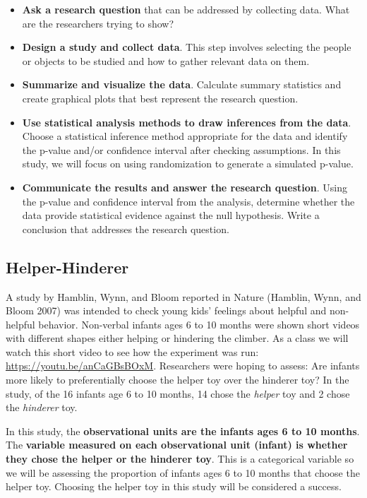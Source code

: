 \documentclass[
]{report}
\begin{document}
\begin{itemize}
\item
  \textbf{Ask a research question} that can be addressed by collecting data. What are the researchers trying to show?
\item
  \textbf{Design a study and collect data}. This step involves selecting the people or objects to be studied and how to gather relevant data on them.
\item
  \textbf{Summarize and visualize the data}. Calculate summary statistics and create graphical plots that best represent the research question.
\item
  \textbf{Use statistical analysis methods to draw inferences from the data}. Choose a statistical inference method appropriate for the data and identify the p-value and/or confidence interval after checking assumptions. In this study, we will focus on using randomization to generate a simulated p-value.
\item
  \textbf{Communicate the results and answer the research question}. Using the p-value and confidence interval from the analysis, determine whether the data provide statistical evidence against the null hypothesis. Write a conclusion that addresses the research question.
\end{itemize}

\newpage

\hypertarget{helper-hinderer}{%
\subsection{Helper-Hinderer}\label{helper-hinderer}}

A study by Hamblin, Wynn, and Bloom reported in Nature (Hamblin, Wynn, and Bloom 2007) was intended to check young kids' feelings about helpful and non-helpful behavior. Non-verbal infants ages 6 to 10 months were shown short videos with different shapes either helping or hindering the climber. As a class we will watch this short video to see how the experiment was run: \url{https://youtu.be/anCaGBsBOxM}. Researchers were hoping to assess: Are infants more likely to preferentially choose the helper toy over the hinderer toy? In the study, of the 16 infants age 6 to 10 months, 14 chose the \emph{helper} toy and 2 chose the \emph{hinderer} toy.

In this study, the \textbf{observational units are the infants ages 6 to 10 months}. The \textbf{variable measured on each observational unit (infant) is whether they chose the helper or the hinderer toy}. This is a categorical variable so we will be assessing the proportion of infants ages 6 to 10 months that choose the helper toy. Choosing the helper toy in this study will be considered a success.
\end{document}
